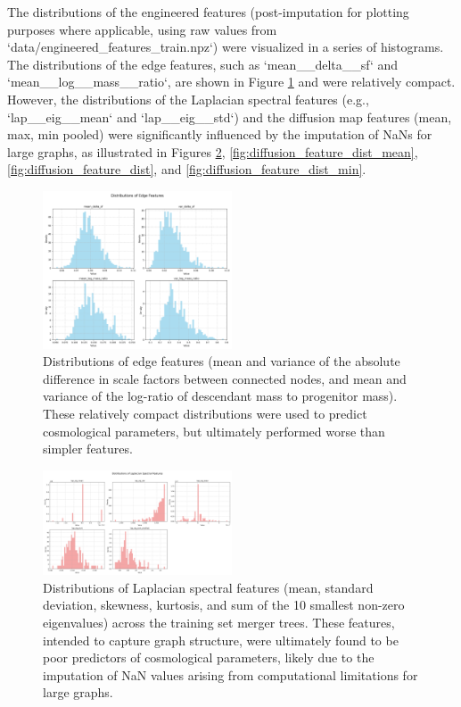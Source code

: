 \documentclass[twocolumn]{aastex631}
\begin{document}
The distributions of the engineered features (post-imputation for plotting purposes where applicable, using raw values from `data/engineered\_features\_train.npz`) were visualized in a series of histograms. The distributions of the edge features, such as `mean\_\_delta\_\_sf` and `mean\_\_log\_\_mass\_\_ratio`, are shown in Figure \ref{fig:edge_feature_dist} and were relatively compact. However, the distributions of the Laplacian spectral features (e.g., `lap\_\_eig\_\_mean` and `lap\_\_eig\_\_std`) and the diffusion map features (mean, max, min pooled) were significantly influenced by the imputation of NaNs for large graphs, as illustrated in Figures \ref{fig:laplacian_feature_dist}, \ref{fig:diffusion_feature_dist_mean}, \ref{fig:diffusion_feature_dist}, and \ref{fig:diffusion_feature_dist_min}.

\begin{figure}[h!]
    \centering
    \includegraphics[width=0.5\textwidth]{../input_files/plots/engineered_feature_dist_edge_1_20250527-135752.png}
    \caption{Distributions of edge features (mean and variance of the absolute difference in scale factors between connected nodes, and mean and variance of the log-ratio of descendant mass to progenitor mass). These relatively compact distributions were used to predict cosmological parameters, but ultimately performed worse than simpler features.}
    \label{fig:edge_feature_dist}
\end{figure}

\begin{figure}[h!]
    \centering
    \includegraphics[width=0.5\textwidth]{../input_files/plots/engineered_feature_dist_laplacian_2_20250527-135752.png}
    \caption{Distributions of Laplacian spectral features (mean, standard deviation, skewness, kurtosis, and sum of the 10 smallest non-zero eigenvalues) across the training set merger trees. These features, intended to capture graph structure, were ultimately found to be poor predictors of cosmological parameters, likely due to the imputation of NaN values arising from computational limitations for large graphs.}
    \label{fig:laplacian_feature_dist}
\end{figure}
\end{document}
